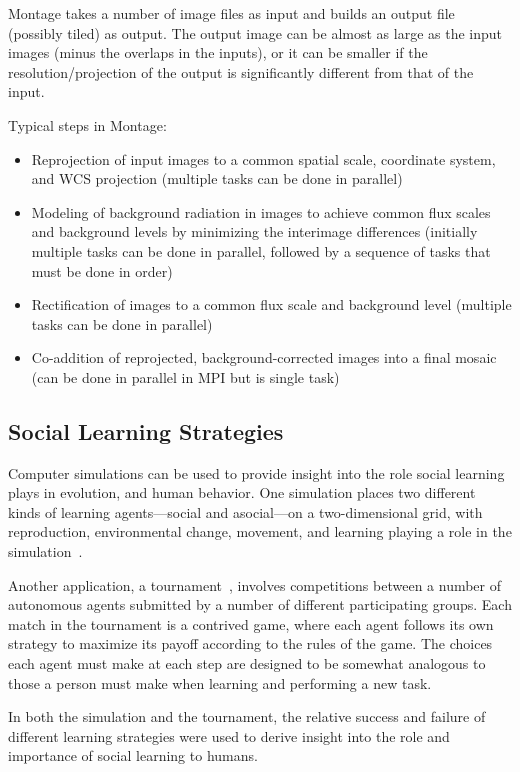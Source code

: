 \documentclass[10pt,letterpaper]{article}
\begin{document}
Montage takes a number of image files as input and builds an output file (possibly tiled) as output.  The output image can be almost as large as the input images (minus the overlaps in the inputs), or it can be smaller if the resolution/projection of the output is significantly different from that of the input.

Typical steps in Montage:
\begin{itemize}
\item Reprojection of input images to a common spatial scale, coordinate system,
and WCS projection (multiple tasks can be done in parallel)
\item Modeling of background radiation in images to achieve common flux scales
and background levels by minimizing the interimage differences (initially multiple tasks can be done in parallel, followed by a sequence of tasks that must be done in order)
\item Rectification of images to a common flux scale and background level (multiple tasks can be done in parallel)
\item Co-addition of reprojected, background-corrected images into a final mosaic (can be done in parallel in MPI but is single task)
\end{itemize}

\subsection{Social Learning Strategies}


Computer simulations can be used to provide insight into the role social
learning plays in evolution, and human behavior.
One simulation places two different kinds of learning agents---social
and asocial---on a two-dimensional grid, with reproduction, environmental change,
movement, and learning playing a role in the simulation~\cite{rendell-sociallearning-09}.

Another application, a tournament~\cite{rendell-sociallearning-10}, involves
competitions between a number of autonomous agents submitted by a number of
different
participating groups.  Each match in the tournament
is a contrived game, where each agent follows its own strategy to maximize
its payoff according to the rules of the game.  The choices each agent must
make at each step are designed to be somewhat analogous to those a person
must make when learning and performing a  new task.

In both the simulation and the tournament, the relative success and failure of
different learning strategies were used to derive insight into
the role and importance of social learning to humans.
\end{document}
